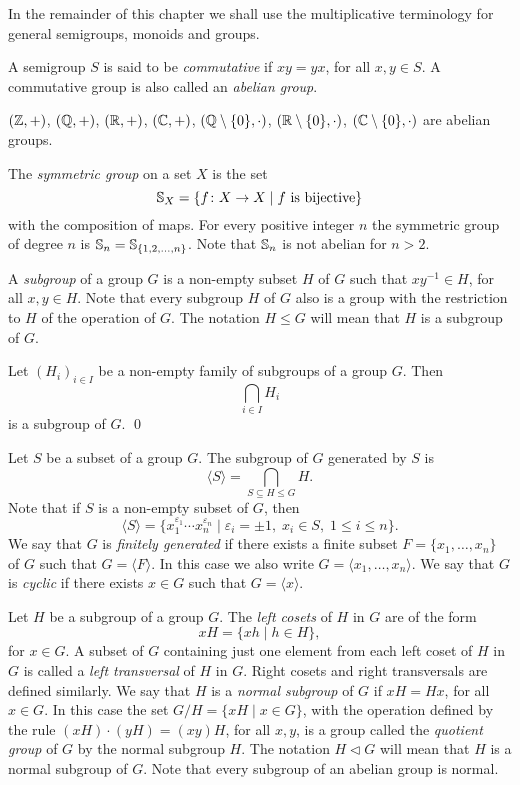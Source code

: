 In the remainder of this chapter we shall use the multiplicative terminology for general semigroups, monoids and groups.

A semigroup $S$ is said to be {\em commutative} if $xy=yx$, for all $x,y\in S$. A commutative group is also called an {\em abelian group}.

\begin{example}
 $(\mathbb{Z}, +)$,  $(\mathbb{Q}, +)$, $(\mathbb{R}, +)$, $(\mathbb{C}, +)$, $(\mathbb{Q}\setminus\{0\}, \cdot)$, $(\mathbb{R}\setminus\{0\}, \cdot)$, 
	$(\mathbb{C}\setminus\{0\}, \cdot)$ are abelian groups.
\end{example}

\begin{example}
	The {\em symmetric group} on a set $X$ is the set 
$$\mathbb{S}_X=\{ f\colon X\rightarrow X\mid f \mbox{ is bijective}\}$$
with the composition of maps. For every positive integer $n$ the symmetric group of degree $n$ is
$\mathbb{S}_n=\mathbb{S}_{\{ 1,2,\dots ,n\}}$. Note that $\mathbb{S}_n$ is not abelian for $n>2$.
\end{example}    



A {\em subgroup} of a group $G$ is a non-empty subset $H$ of $G$ such that $xy^{-1}\in H$, for all $x,y\in H$. Note that every subgroup $H$ of $G$ also is a group with the restriction to $H$ of the operation of $G$. The notation $H\leq G$ will mean that $H$ is a subgroup of $G$.

\begin{proposition}\label{intersection}
	Let $(H_i)_{i\in I}$ be a non-empty family of subgroups of a group $G$. Then 
	\[ \bigcap_{i\in I}H_i \]
    is a subgroup of $G$. \qed
	\end{proposition}   

Let $S$ be a subset of a group $G$. The subgroup of $G$ generated by $S$ is
$$\langle S\rangle=\bigcap_{S\subseteq H\leq G}H.$$
Note that if $S$ is a non-empty subset of $G$, then
$$\langle S\rangle=\{ x_1^{\varepsilon_1}\cdots x_n^{\varepsilon_n}\mid \varepsilon_i=\pm 1,\; x_i\in S,\; 1\leq i\leq n \}.$$
We say that $G$ is {\em finitely generated} if there exists a finite subset $F=\{ x_1,\dots ,x_n\}$ of $G$ such that $G=\langle F\rangle$. In this case we also write $G=\langle x_1,\dots ,x_n\rangle$. We say that $G$ is {\em cyclic} if there exists $x\in G$ such that $G=\langle x\rangle$. 

Let $H$ be a subgroup of a group $G$. The {\em left cosets} of $H$ in $G$ are of the form
$$xH=\{ xh\mid h\in H\},$$
for $x\in G$. A subset of $G$ containing just one element from each left coset of $H$ in $G$ is called a {\em left transversal} of $H$ in $G$. Right cosets and right transversals are defined similarly.
We say that $H$ is a {\em normal subgroup} of $G$ if $xH=Hx$, for all $x\in G$. In this case the set
$G/H=\{xH\mid x\in G\}$, with the operation defined by the rule $(xH)\cdot (yH)=(xy)H$, for all $x,y$, is a group called the {\em quotient group} of $G$ by the normal subgroup $H$. The notation $H\lhd G$ will mean that $H$ is a normal subgroup of $G$. Note that every subgroup of an abelian group is normal.

